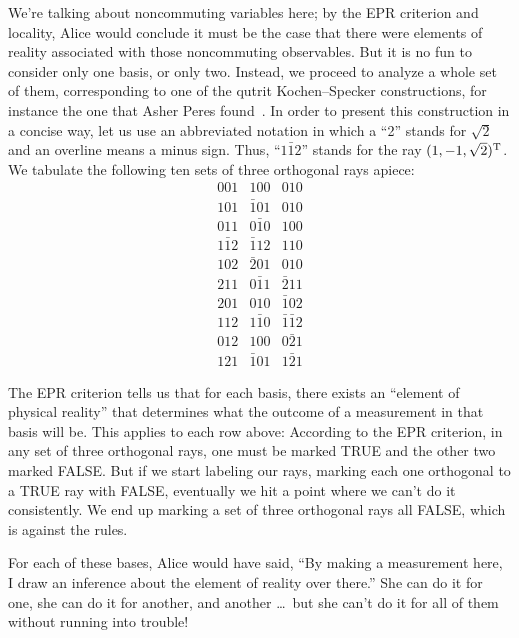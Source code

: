 \documentclass[aps,pra,superscriptaddress,10pt,tightenlines,twocolumn,nofootinbib]{revtex4}
\begin{document}
We're talking about noncommuting variables here; by the EPR criterion
and locality, Alice would conclude it must be the case that there were
elements of reality associated with those noncommuting observables.
But it is no fun to consider only one basis, or only two.  Instead, we
proceed to analyze a whole set of them, corresponding to one of the
qutrit Kochen--Specker constructions, for instance the one that Asher
Peres found~\cite{Peres95}.  In order to present this construction in
a concise way, let us use an abbreviated notation in which a ``2''
stands for $\sqrt{2}$ and an overline means a minus sign.  Thus,
``$1\bar{1}2$'' stands for the ray $(1, -1, \sqrt{2})^{\rm T}$.  We
tabulate the following ten sets of three orthogonal rays apiece:
\begin{equation}
\begin{array}{ccc}
001 & 100 & 010 \\
101 & \bar{1}01 & 010 \\
011 & 0\bar{1}0 & 100 \\
1\bar{1}2 & \bar{1}12 & 110 \\
102 & \bar{2}01 & 010 \\
211 & 0\bar{1}1 & \bar{2}11 \\
201 & 010 & \bar{1}02 \\
112 & 1\bar{1}0 & \bar{1}\bar{1}2 \\
012 & 100 & 0\bar{2}1 \\
121 & \bar{1}01 & 1\bar{2}1
\end{array}
\end{equation}

The EPR criterion tells us that for each basis, there exists an
``element of physical reality'' that determines what the outcome of a
measurement in that basis will be.  This applies to each row above:
According to the EPR criterion, in any set of three orthogonal rays,
one must be marked TRUE and the other two marked FALSE.  But if we start
labeling our rays, marking each one orthogonal to a TRUE ray with FALSE,
eventually we hit a point where we can't do it consistently.  We end
up marking a set of three orthogonal rays all FALSE, which is against the
rules.

For each of these bases, Alice would have said, ``By making a
measurement here, I draw an inference about the element of reality
over there.''  She can do it for one, she can do it for another, and
another \ldots\ but she can't do it for all of them without running
into trouble!
\end{document}
